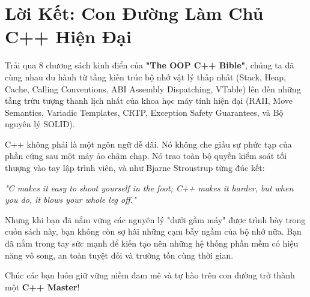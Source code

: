 \documentclass[12pt,a4paper,oneside]{book}
\begin{document}
\chapter*{Lời Kết: Con Đường Làm Chủ C++ Hiện Đại}

Trải qua 8 chương sách kinh điển của \textbf{"The OOP C++ Bible"}, chúng ta đã cùng nhau du hành từ tầng kiến trúc bộ nhớ vật lý thấp nhất (Stack, Heap, Cache, Calling Conventions, ABI Assembly Dispatching, VTable) lên đến những tầng trừu tượng thanh lịch nhất của khoa học máy tính hiện đại (RAII, Move Semantics, Variadic Templates, CRTP, Exception Safety Guarantees, và Bộ nguyên lý SOLID).

C++ không phải là một ngôn ngữ dễ dãi. Nó không che giấu sự phức tạp của phần cứng sau một máy ảo chậm chạp. Nó trao toàn bộ quyền kiểm soát tối thượng vào tay lập trình viên, và như Bjarne Stroustrup từng đúc kết:
\begin{center}
\textit{"C makes it easy to shoot yourself in the foot; C++ makes it harder, but when you do, it blows your whole leg off."}
\end{center}

Nhưng khi bạn đã nắm vững các nguyên lý "dưới gầm máy" được trình bày trong cuốn sách này, bạn không còn sợ hãi những cạm bẫy ngầm của bộ nhớ nữa. Bạn đã nắm trong tay sức mạnh để kiến tạo nên những hệ thống phần mềm có hiệu năng vô song, an toàn tuyệt đối và trường tồn cùng thời gian.

Chúc các bạn luôn giữ vững niềm đam mê và tự hào trên con đường trở thành một \textbf{C++ Master}!
\end{document}
